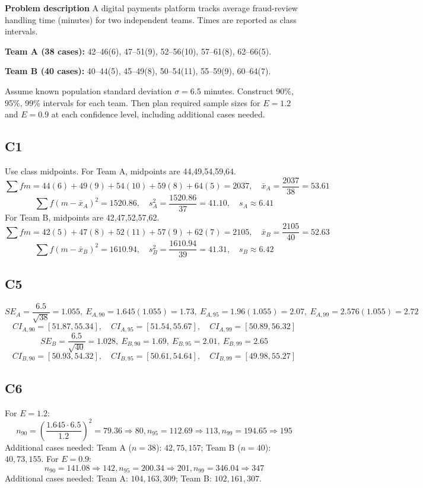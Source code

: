 \begin{ExamProblems}
		\newpage
		\item
		\textbf{Problem description}
		A digital payments platform tracks average fraud-review handling time (minutes) for two independent teams.
		Times are reported as class intervals.
		
		\textbf{Team A (38 cases):} 42--46(6), 47--51(9), 52--56(10), 57--61(8), 62--66(5).
		
		\textbf{Team B (40 cases):} 40--44(5), 45--49(8), 50--54(11), 55--59(9), 60--64(7).
		
		Assume known population standard deviation $\sigma=6.5$ minutes.
		Construct 90\%, 95\%, 99\% intervals for each team.
		Then plan required sample sizes for $E=1.2$ and $E=0.9$ at each confidence level, including additional cases needed.
		
		\subsection*{C1}
		Use class midpoints.
		For Team A, midpoints are 44,49,54,59,64.
		\[
		\sum fm=44(6)+49(9)+54(10)+59(8)+64(5)=2037,
		\quad \bar{x}_A=\frac{2037}{38}=53.61
		\]
		\[
		\sum f(m-\bar{x}_A)^2=1520.86,
		\quad s_A^2=\frac{1520.86}{37}=41.10,
		\quad s_A\approx6.41
		\]
		For Team B, midpoints are 42,47,52,57,62.
		\[
		\sum fm=42(5)+47(8)+52(11)+57(9)+62(7)=2105,
		\quad \bar{x}_B=\frac{2105}{40}=52.63
		\]
		\[
		\sum f(m-\bar{x}_B)^2=1610.94,
		\quad s_B^2=\frac{1610.94}{39}=41.31,
		\quad s_B\approx6.42
		\]
		
		\subsection*{C5}
		\[
		SE_A=\frac{6.5}{\sqrt{38}}=1.055,
		\ E_{A,90}=1.645(1.055)=1.73,
		\ E_{A,95}=1.96(1.055)=2.07,
		\ E_{A,99}=2.576(1.055)=2.72
		\]
		\[
		CI_{A,90}=[51.87,55.34],\quad CI_{A,95}=[51.54,55.67],\quad CI_{A,99}=[50.89,56.32]
		\]
		\[
		SE_B=\frac{6.5}{\sqrt{40}}=1.028,
		\ E_{B,90}=1.69,
		\ E_{B,95}=2.01,
		\ E_{B,99}=2.65
		\]
		\[
		CI_{B,90}=[50.93,54.32],\quad CI_{B,95}=[50.61,54.64],\quad CI_{B,99}=[49.98,55.27]
		\]
		
		\subsection*{C6}
		For $E=1.2$:
		\[
		n_{90}=\left(\frac{1.645\cdot6.5}{1.2}\right)^2=79.36\Rightarrow80,
		n_{95}=112.69\Rightarrow113,
		n_{99}=194.65\Rightarrow195
		\]
		Additional cases needed:
		Team A ($n=38$): $42,75,157$; Team B ($n=40$): $40,73,155$.
		For $E=0.9$:
		\[
		n_{90}=141.08\Rightarrow142,
		n_{95}=200.34\Rightarrow201,
		n_{99}=346.04\Rightarrow347
		\]
		Additional cases needed:
		Team A: $104,163,309$; Team B: $102,161,307$.


\end{ExamProblems}
